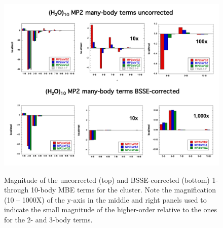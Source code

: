 \documentclass[11pt, proquest]{uwthesis}[2020/02/24]
\let\ce\ch
\begin{document}
\begin{figure}[t]
\uwsinglespace
\centering
\includegraphics[width=\textwidth]{Figures/Chapter_2/W10_MP2_MB.pdf}
\label{fig:MBE_I_F2}
\caption[temp]{Magnitude of the uncorrected (top) and BSSE-corrected (bottom) 1- through 10-body MBE terms for the \ce{(H2O)_{10}} cluster. Note the magnification (10 – 1000X) of the y-axis in the middle and right panels used to indicate the small magnitude of the higher-order relative to the ones for the 2- and 3-body terms.}
\end{figure}
\end{document}

